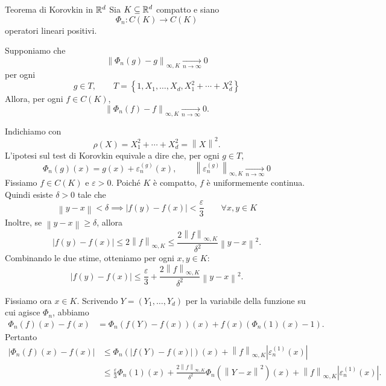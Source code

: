 \documentclass[a4paper]{article}
\begin{document}
\begin{snippettheorem}{Teorema di Korovkin in \(\mathbb{R}^d\)}
    Sia \(K\subseteq\mathbb{R}^d\) compatto e siano
    \[
        \Phi_n:C(K)\longrightarrow C(K)
    \]
    operatori lineari positivi.

    Supponiamo che
    \[
        \left\|\Phi_n(g)-g\right\|_{\infty,K}
        \xrightarrow[n\to\infty]{}
        0
    \]
    per ogni
    \[
        g\in T,
        \qquad
        T=
        \left\{
            1,
            X_1,\dots,X_d,
            X_1^2+\cdots+X_d^2
        \right\}
    \]
    Allora, per ogni \(f\in C(K)\),
    \[
        \left\|\Phi_n(f)-f\right\|_{\infty,K}
        \xrightarrow[n\to\infty]{}
        0.
    \]
\end{snippettheorem}

\begin{snippetproof}{}
    Indichiamo con
    \[
        \rho(X)=X_1^2+\cdots+X_d^2=\left\|X\right\|^2.
    \]
    L'ipotesi sul test di Korovkin equivale a dire che, per ogni \(g\in T\),
    \[
        \Phi_n(g)(x)
        =
        g(x)+\varepsilon_n^{(g)}(x),
        \qquad
        \left\|\varepsilon_n^{(g)}\right\|_{\infty,K}
        \xrightarrow[n\to\infty]{}
        0
    \]
    Fissiamo \(f\in C(K)\) e \(\varepsilon>0\). Poiché \(K\) è compatto, \(f\) è uniformemente continua. Quindi esiste \(\delta>0\) tale che
    \[
        \left\|y-x\right\|<\delta
        \implies
        |f(y)-f(x)|<\frac{\varepsilon}{3}
        \qquad
        \forall x,y\in K
    \]
    Inoltre, se \(\left\|y-x\right\|\geq\delta\), allora
    \[
        |f(y)-f(x)|
        \leq
        2\left\|f\right\|_{\infty,K}
        \leq
        \frac{2\left\|f\right\|_{\infty,K}}{\delta^2}
        \left\|y-x\right\|^2.
    \]
    Combinando le due stime, otteniamo per ogni \(x,y\in K\):
    \[
        |f(y)-f(x)|
        \leq
        \frac{\varepsilon}{3}
        +
        \frac{2\left\|f\right\|_{\infty,K}}{\delta^2}
        \left\|y-x\right\|^2.
    \]

    Fissiamo ora \(x\in K\). Scrivendo \(Y=(Y_1,\dots,Y_d)\) per la variabile della funzione su cui agisce \(\Phi_n\), abbiamo
    \begin{align*}
        \Phi_n(f)(x)-f(x)
        &=
        \Phi_n(f(Y)-f(x))(x)
        +
        f(x)\left(\Phi_n(1)(x)-1\right).
    \end{align*}
    Pertanto
    \begin{align*}
        \left|\Phi_n(f)(x)-f(x)\right|
        &\leq
        \Phi_n(|f(Y)-f(x)|)(x)
        +
        \left\|f\right\|_{\infty,K}
        \left|\varepsilon_n^{(1)}(x)\right| \\
        &\leq
        \frac{\varepsilon}{3}\Phi_n(1)(x)
        +
        \frac{2\left\|f\right\|_{\infty,K}}{\delta^2}
        \Phi_n(\left\|Y-x\right\|^2)(x)
        +
        \left\|f\right\|_{\infty,K}
        \left|\varepsilon_n^{(1)}(x)\right|.
    \end{align*}


\end{snippetproof}
\end{document}
